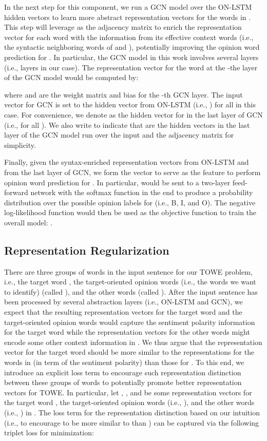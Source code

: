 \documentclass[11pt,a4paper]{article}
\begin{document}
In the next step for this component, we run a GCN model over the ON-LSTM hidden vectors  to learn more abstract representation vectors for the words in . This step will leverage  as the adjacency matrix to enrich the representation vector for each word  with the information from its effective context words (i.e., the syntactic neighboring words of  and ), potentially improving the opinion word prediction for . In particular, the GCN model in this work involves several layers (i.e.,  layers in our case). The representation vector  for the word  at the -the layer of the GCN model would be computed by:

where  and  are the weight matrix and bias for the -th GCN layer. The input vector  for GCN is set to the hidden vector  from ON-LSTM (i.e., ) for all  in this case. For convenience, we denote  as the hidden vector for  in the last layer of GCN (i.e.,  for all ). We also write  to indicate that  are the hidden vectors in the last layer of the GCN model run over the input  and the adjacency matrix  for simplicity.

Finally, given the syntax-enriched representation vectors  from ON-LSTM and  from the last layer of GCN, we form the vector  to serve as the feature to perform opinion word prediction for . In particular,  would be sent to a two-layer feed-forward network with the softmax function in the end to produce a probability distribution  over the possible opinion labels for  (i.e., B, I, and O). The negative log-likelihood function  would then be used as the objective function to train the overall model: .








\subsection{Representation Regularization}
\label{sec:reg}
There are three groups of words in the input sentence  for our TOWE problem, i.e., the target word , the target-oriented opinion words (i.e., the words we want to identify) (called ), and the other words (called ). After the input sentence  has been processed by several abstraction layers (i.e., ON-LSTM and GCN), we expect that the resulting representation vectors for the target word and the target-oriented opinion words would capture the sentiment polarity information for the target word while the representation vectors for the other words might encode some other context information in . We thus argue that the representation vector for the target word should be more similar to the representations for the words in  (in term of the sentiment polarity) than those for . To this end, we introduce an explicit loss term to encourage such representation distinction between these groups of words to potentially promote better representation vectors for TOWE. In particular, let , , and  be some representation vectors for the target word , the target-oriented opinion words (i.e., ), and the other words (i.e., ) in . The loss term for the representation distinction based on our intuition (i.e., to encourage  to be more similar to  than ) can be captured via the following triplet loss for minimization:
\end{document}
